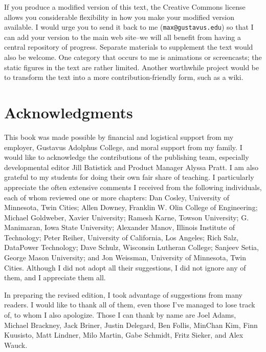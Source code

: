 If you produce a modified version of this text, the Creative Commons license allows you considerable flexibility in how you make your modified version available.  I would urge you to send it back to me (\verb|max@gustavus.edu|) so that I can add your version to the main web site--we will all benefit from having a central repository of progress.  Separate materials to supplement the text would also be welcome.  One category that occurs to me is animations or screencasts; the static figures in the text are rather limited. Another worthwhile project would be to transform the text into a more contribution-friendly form, such as a wiki.

\section*{Acknowledgments}

This book was made possible by financial and logistical support from
my employer, Gustavus Adolphus College, and moral support from my
family.  I would like to acknowledge the contributions of the
publishing team, especially developmental editor Jill Batistick and
Product Manager Alyssa Pratt.  I am also grateful to my students for
doing their own fair share of teaching.  I particularly appreciate the
often extensive comments I received from the following individuals,
each of whom reviewed one or more chapters: Dan Cosley, University of
Minnesota, Twin Cities; Allen Downey, Franklin W. Olin College of
Engineering; Michael Goldweber, Xavier University; Ramesh Karne,
Towson University; G. Manimaran, Iowa State University; Alexander
Manov, Illinois Institute of Technology; Peter Reiher, University of
California, Los Angeles; Rich Salz, DataPower Technology; Dave Schulz,
Wisconsin Lutheran College; Sanjeev Setia, George Mason University;
and Jon Weissman, University of Minnesota, Twin Cities.  Although I
did not adopt all their suggestions, I did not ignore any of them, and
I appreciate them all.

In preparing the revised edition, I took advantage of suggestions from many readers.  I would like to thank all of them, even those I've managed to lose track of, to whom I also apologize.  Those I can thank by name are Joel Adams, Michael Brackney, Jack Briner, Justin Delegard, Ben Follis, MinChan Kim, Finn Kuusisto, Matt Lindner, Milo Martin, Gabe Schmidt, Fritz Sieker, and Alex Wauck.

